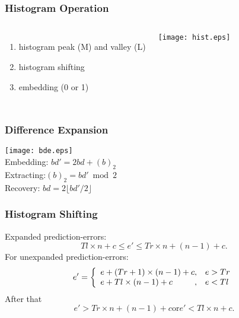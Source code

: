 \documentclass[slidestop,compress]{beamer}
\begin{document}
\appendix
\section{\appendixname}
\begin{frame}
    \frametitle{Histogram Operation}
    \begin{columns}[c]
	    \begin{enumerate}
		\item histogram peak (M) and valley (L)
		\item histogram shifting
		\item embedding (0 or 1)
	    \end{enumerate}
	    \texttt{[image: hist.eps]}
    \end{columns}
\end{frame}

\begin{frame}
    \frametitle{Difference Expansion}
    \centering
    \texttt{[image: bde.eps]} \\
    Embedding: $ bd' = 2bd + (b)_2 $ \\
    Extracting:$ (b)_2 = bd' \bmod 2 $\\
    Recovery: $ bd = 2 \lfloor bd'/2 \rfloor $\\

\end{frame}


\begin{frame}
    \frametitle{Histogram Shifting}
    Expanded prediction-errors:
    \begin{equation}\label{eqn:range1}
	Tl \times n + c \le e' \le Tr \times n + (n-1) + c.
    \end{equation}
    For unexpanded prediction-errors:
    \begin{equation}\label{eqn:shift}
	e' = \left\{\begin{array}{l@{,\quad}l}
	    e + (Tr+1) \times (n-1) + c	& e > Tr \\
	    e + Tl \times (n-1) + c	& e < Tl \\
	    \end{array}\right. 
    \end{equation}
    After that
    \begin{equation}\label{eqn:range2}
	e' > Tr \times n + (n-1) + c \mbox{or} e' < Tl \times n + c.
    \end{equation}
\end{frame}
\end{document}
